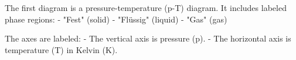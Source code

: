 The first diagram is a pressure-temperature (p-T) diagram. It includes labeled phase regions:  
- "Fest" (solid)  
- "Flüssig" (liquid)  
- "Gas" (gas)  

The axes are labeled:  
- The vertical axis is pressure (p).  
- The horizontal axis is temperature (T) in Kelvin (K).